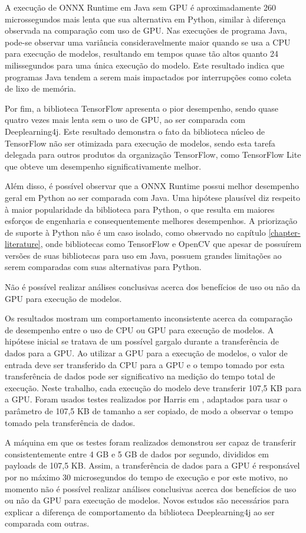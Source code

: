 A execução de ONNX Runtime em Java sem GPU é aproximadamente 260 microssegundos mais lenta que sua alternativa em Python, similar à diferença observada na comparação com uso de GPU. Nas execuções de programa Java, pode-se observar uma variância consideravelmente maior quando se usa a CPU para execução de modelos, resultando em tempos quase tão altos quanto 24 milissegundos para uma única execução do modelo. Este resultado indica que programas Java tendem a serem mais impactados por interrupções como coleta de lixo de memória.

Por fim, a biblioteca TensorFlow apresenta o pior desempenho, sendo quase quatro vezes mais lenta sem o uso de GPU, ao ser comparada com Deeplearning4j. Este resultado demonstra o fato da biblioteca núcleo de TensorFlow não ser otimizada para execução de modelos, sendo esta tarefa delegada para outros produtos da organização TensorFlow, como TensorFlow Lite que obteve um desempenho significativamente melhor.

Além disso, é possível observar que a ONNX Runtime possui melhor desempenho geral em Python ao ser comparada com Java. Uma hipótese plausível diz respeito à maior popularidade da biblioteca para Python, o que resulta em maiores esforços de engenharia e consequentemente melhores desempenhos. A priorização de suporte à Python não é um caso isolado, como observado no capítulo \ref{chapter-literature}, onde bibliotecas como TensorFlow e OpenCV que apesar de possuírem versões de suas bibliotecas para uso em Java, possuem grandes limitações ao serem comparadas com suas alternativas para Python.

Não é possível realizar análises conclusivas acerca dos benefícios de uso ou não da GPU para execução de modelos.

Os resultados mostram um comportamento inconsistente acerca da comparação de desempenho entre o uso de CPU ou GPU para execução de modelos. A hipótese inicial se tratava de um possível gargalo durante a transferência de dados para a GPU. Ao utilizar a GPU para a execução de modelos, o valor de entrada deve ser transferido da CPU para a GPU e o tempo tomado por esta transferência de dados pode ser significativo na medição do tempo total de execução. Neste trabalho, cada execução do modelo deve transferir 107,5 KB para a GPU. Foram usados testes realizados por Harris em \cite{harris_2012}, adaptados para usar o parâmetro de 107,5 KB de tamanho a ser copiado, de modo a observar o tempo tomado pela transferência de dados.

A máquina em que os testes foram realizados demonstrou ser capaz de transferir consistentemente entre 4 GB e 5 GB de dados por segundo, divididos em payloads de 107,5 KB. Assim, a transferência de dados para a GPU é responsável por no máximo 30 microsegundos do tempo de execução e por este motivo, no momento não é possível realizar análises conclusivas acerca dos benefícios de uso ou não da GPU para execução de modelos. Novos estudos são necessários para explicar a diferença de comportamento da biblioteca Deeplearning4j ao ser comparada com outras.
